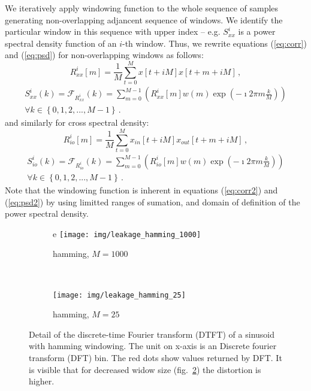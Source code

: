 We iteratively apply windowing function to the whole sequence of samples generating 
non-overlapping adjancent sequence of windows. 
We identify the particular window in this sequence with upper index -- 
e.g. $S_{xx}^i$ is a power spectral density function of an $i$-th window.
Thus, we rewrite equations (\ref{eq:corr}) and (\ref{eq:psd}) for non-overlapping 
windows as follows:
\begin{equation}\label{eq:corr2}
R_{xx}^i\left[m\right] = \frac{1}{M} \sum_{t=0}^{M}
 x\left[t+iM\right]x\left[t+m+iM\right] \, , 
\end{equation}
\begin{equation}\label{eq:psd2}
\begin{split}
S_{xx}^i(k) = \mathcal{F}_{R_{xx}^i}\left(k\right) = \sum_{m=0}^{M-1}
\left( R_{xx}^i \left[m\right] w(m) \exp\left( -\imath 2\pi m\frac{k}{M} \right)\right)\\
\forall k \in \left\{ 0,1,2,...,M-1 \right\}\, . 
\end{split}
\end{equation}
and similarly for cross spectral density:
\begin{equation}\label{eq:xcorr2}
R_{io}^i\left[m\right] = \frac{1}{M} \sum_{t=0}^{M} 
 x_{in}\left[t+iM\right]x_{out}\left[t+m+iM\right] \, , 
\end{equation}
\begin{equation}\label{eq:xpsd2}
\begin{split}
S_{io}^i(k) = \mathcal{F}_{R_{io}^i}\left(k\right) = \sum_{m=0}^{M-1}
\left( R_{io}^i \left[m\right] w(m) \exp\left( -\imath 2\pi m\frac{k}{M} \right)\right)\\
\forall k \in \left\{ 0,1,2,...,M-1 \right\}\, . 
\end{split}
\end{equation}
Note that the windowing function is inherent in equations (\ref{eq:corr2}) and (\ref{eq:psd2})
by using limitted ranges of sumation, and domain of definition of the power spectral density.

\begin{figure}[h!]%
  \centering
        \begin{subfigure}[b]{0.5\textwidth}e
                \centering
                \texttt{[image: img/leakage\_hamming\_1000]}
                \caption{\small hamming, $M=1000$}
                \label{fig:leakage_hamming_1000}
        \end{subfigure}%
        ~ \begin{subfigure}[b]{0.5\textwidth}
                \centering
                \texttt{[image: img/leakage\_hamming\_25]}
                \caption{\small hamming, $M=25$}
                \label{fig:leakage_hamming_25}
        \end{subfigure}%
  \caption{\small Detail of the discrete-time Fourier transform (DTFT) of a sinusoid 
  with hamming windowing.
  The unit on x-axis is an Discrete fourier transform (DFT) bin.
  The red dots show values returned by DFT. It is visible that for decreased widow
   size (fig.~\ref{fig:leakage_hamming_25}) the distortion is higher.}
  \label{fig:leakage_hamming}
\end{figure}

